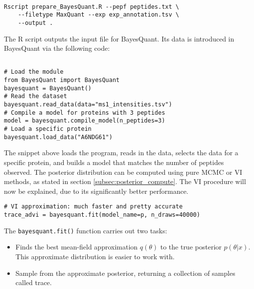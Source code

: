 
\begin{verbatim}

Rscript prepare_BayesQuant.R --pepf peptides.txt \
    --filetype MaxQuant --exp exp_annotation.tsv \
    --output .
\end{verbatim}

The R script outputs the input file for BayesQuant. Its data is introduced in BayesQuant via the following code:

\begin{verbatim}

# Load the module
from BayesQuant import BayesQuant
bayesquant = BayesQuant()
# Read the dataset
bayesquant.read_data(data="ms1_intensities.tsv")
# Compile a model for proteins with 3 peptides
model = bayesquant.compile_model(n_peptides=3)
# Load a specific protein
bayesquant.load_data("A6NDG61")
\end{verbatim}

The snippet above loads the program, reads in the data, selects the data for a specific protein, and builds a model that matches the number of peptides observed. The posterior distribution can be computed using pure MCMC or VI methods, as stated in section \ref{subsec:posterior_compute}. The VI procedure will now be explained, due to its significantly better performance.

\begin{verbatim}
# VI approximation: much faster and pretty accurate
trace_advi = bayesquant.fit(model_name=p, n_draws=40000)
\end{verbatim}

The \texttt{bayesquant.fit()} function carries out two tasks:

\begin{itemize}
\item Finds the best mean-field approximation $q(\theta)$ to the true posterior $p(\theta|x)$. This approximate distribution is easier to work with.
\item Sample from the approximate posterior, returning a collection of samples called trace.
\end{itemize}

